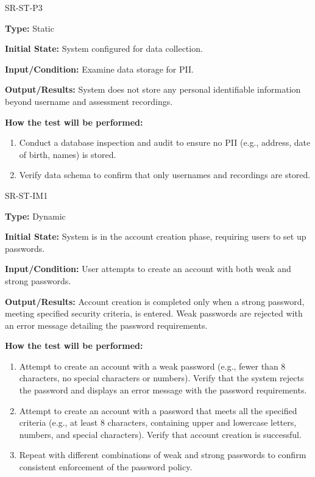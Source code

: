 \documentclass[12pt, titlepage]{article}
\begin{document}
\begin{itemize}
  \begin{item}
    SR-ST-P3
    \begin{mdframed}[linewidth=0.5mm]
      \textbf{Type:} Static \par
      \textbf{Initial State:} System configured for data collection. \par
      \textbf{Input/Condition:} Examine data storage for PII. \par
      \textbf{Output/Results:} System does not store any personal identifiable information beyond username and assessment recordings. \par
      \textbf{How the test will be performed:}
      \begin{enumerate}[noitemsep]
        \item Conduct a database inspection and audit to ensure no PII (e.g., address, date of birth, names) is stored.
        \item Verify data schema to confirm that only usernames and recordings are stored.
      \end{enumerate}
    \end{mdframed}
  \end{item}

  \begin{item}
    SR-ST-IM1
    \begin{mdframed}[linewidth=0.5mm]
      \textbf{Type:} Dynamic \par
      \textbf{Initial State:} System is in the account creation phase, requiring users to set up passwords. \par
      \textbf{Input/Condition:} User attempts to create an account with both weak and strong passwords. \par
      \textbf{Output/Results:} Account creation is completed only when a strong password, meeting specified security criteria, is entered. Weak passwords are rejected with an error message detailing the password requirements. \par
      \textbf{How the test will be performed:}
      \begin{enumerate}[noitemsep]
        \item Attempt to create an account with a weak password (e.g., fewer than 8 characters, no special characters or numbers). Verify that the system rejects the password and displays an error message with the password requirements.
        \item Attempt to create an account with a password that meets all the specified criteria (e.g., at least 8 characters, containing upper and lowercase letters, numbers, and special characters). Verify that account creation is successful.
        \item Repeat with different combinations of weak and strong passwords to confirm consistent enforcement of the password policy.
      \end{enumerate}
    \end{mdframed}
  \end{item}

\end{itemize}
\end{document}
